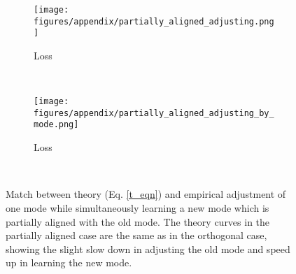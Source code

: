 \documentclass{article}
\begin{document}
\begin{figure}
\centering
\begin{subfigure}[b]{0.49\textwidth}
\texttt{[image: figures/appendix/partially\_aligned\_adjusting.png]}
\caption{Loss}
\end{subfigure}~%
\begin{subfigure}[b]{0.49\textwidth}
\texttt{[image: figures/appendix/partially\_aligned\_adjusting\_by\_mode.png]}
\caption{Loss}
\end{subfigure}~%
\caption{Match between theory (Eq. \ref{t_eqn}) and empirical adjustment of one mode while simultaneously learning a new mode which is partially aligned with the old mode. The theory curves in the partially aligned case are the same as in the orthogonal case, showing the slight slow down in adjusting the old mode and speed up in learning the new mode.}
\label{al_adj_fig}
\end{figure}
\end{document}
